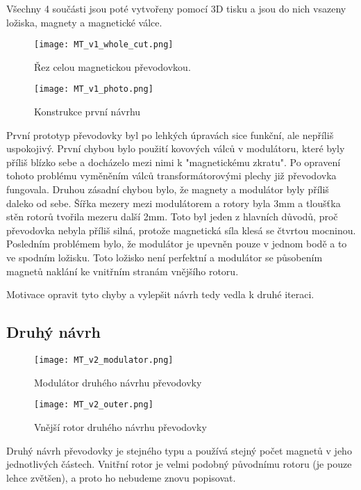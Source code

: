 Všechny 4 součásti jsou poté vytvořeny pomocí 3D tisku a jsou do nich vsazeny ložiska, magnety a magnetické válce.

\begin{figure}[H]
    \raggedright
    \texttt{[image: MT\_v1\_whole\_cut.png]}
    \captionsetup{justification=raggedright,singlelinecheck=false}
    \caption{Řez celou magnetickou převodovkou.}
    \label{fig:MT_v1_whole_cut}
\end{figure}

\clearpage

\begin{wrapfigure}{r}{0.5\textwidth}
    \texttt{[image: MT\_v1\_photo.png]}
    \centering
    \caption{Konstrukce první návrhu}
    \label{fig:MT_v1_inner}
\end{wrapfigure}
První prototyp převodovky byl po lehkých úpravách sice funkční, ale nepříliš uspokojivý. První chybou bylo použití kovových válců v modulátoru, které byly příliš blízko sebe a docházelo mezi nimi k "magnetickému zkratu". Po opravení tohoto problému vyměněním válců transformátorovými plechy již převodovka fungovala. Druhou zásadní chybou bylo, že magnety a modulátor byly příliš daleko od sebe. Šířka mezery mezi modulátorem a rotory byla 3mm a tloušťka stěn rotorů tvořila mezeru další 2mm. Toto byl jeden z hlavních důvodů, proč převodovka nebyla příliš silná, protože magnetická síla klesá se čtvrtou mocninou. Posledním problémem bylo, že modulátor je upevněn pouze v jednom bodě a to ve spodním ložisku. Toto ložisko není perfektní a modulátor se působením magnetů naklání ke vnitřním stranám vnějšího rotoru.

Motivace opravit tyto chyby a vylepšit návrh tedy vedla k druhé iteraci.

\subsection{Druhý návrh}

\begin{wrapfigure}{r}{0.4\textwidth}
    \vspace{-2.5cm}
    \texttt{[image: MT\_v2\_modulator.png]}
    \centering
    \caption{Modulátor druhého návrhu převodovky}
    \label{fig:MT_v2_modulator}

    \texttt{[image: MT\_v2\_outer.png]}
    \centering
    \caption{Vnější rotor druhého návrhu převodovky}
    \label{fig:MT_v2_outer}
\end{wrapfigure}
Druhý návrh převodovky je stejného typu a používá stejný počet magnetů v jeho jednotlivých částech. Vnitřní rotor je velmi podobný původnímu rotoru (je pouze lehce zvětšen), a proto ho nebudeme znovu popisovat. 

